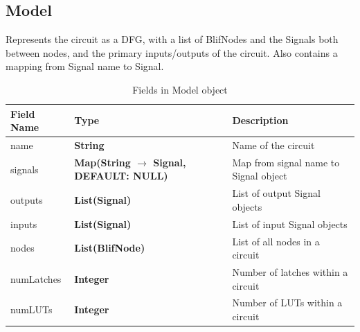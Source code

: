 \documentclass[12pt,final,oneside]{dwThesis} %
\begin{document}
   \subsection{Model}
   Represents the circuit as a \gls{DFG}, with a list of
   BlifNodes and the Signals both between nodes, and the primary inputs/outputs
   of the circuit.  Also contains a mapping from Signal name to Signal.

   \begin{table}

      \begin{tabularx}
         {\linewidth}{lXX} \toprule Field Name & Type &
         Description\\
         \midrule name & \textbf{String} & Name of the circuit
         \\
         signals & \textbf{Map(String $\to$ Signal, DEFAULT: NULL)} & Map
         from signal name to Signal object \\
         outputs & \textbf{List(Signal)} &
         List of output Signal objects \\
         inputs & \textbf{List(Signal)} & List
         of input Signal objects \\
         nodes & \textbf{List(BlifNode)} & List of
         all nodes in a circuit \\
         numLatches & \textbf{Integer} & Number of
         latches within a circuit \\
         numLUTs & \textbf{Integer} & Number of
         LUTs within a circuit \\
         \bottomrule 
      \end{tabularx}
      \caption{Fields in
         Model object} 
   \end{table}
\end{document}
